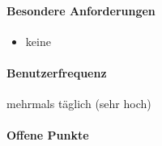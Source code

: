 \paragraph{Besondere Anforderungen}
\begin{itemize}
	\item keine
\end{itemize}

\paragraph{Benutzerfrequenz}
mehrmals täglich (sehr hoch)

\paragraph{Offene Punkte}


\newpage
